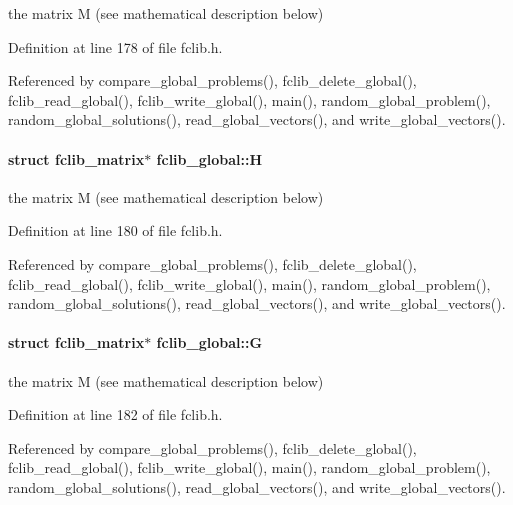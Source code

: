 the matrix M (see mathematical description below) 



Definition at line 178 of file fclib.\+h.



Referenced by compare\+\_\+global\+\_\+problems(), fclib\+\_\+delete\+\_\+global(), fclib\+\_\+read\+\_\+global(), fclib\+\_\+write\+\_\+global(), main(), random\+\_\+global\+\_\+problem(), random\+\_\+global\+\_\+solutions(), read\+\_\+global\+\_\+vectors(), and write\+\_\+global\+\_\+vectors().

\hypertarget{structfclib__global_ac87d5553d144625b9006e2e8b0c89b3c}{}
\paragraph[{H}]{\setlength{\rightskip}{0pt plus 5cm}struct {\bf fclib\+\_\+matrix}$\ast$ fclib\+\_\+global\+::\+H}\label{structfclib__global_ac87d5553d144625b9006e2e8b0c89b3c}


the matrix M (see mathematical description below) 



Definition at line 180 of file fclib.\+h.



Referenced by compare\+\_\+global\+\_\+problems(), fclib\+\_\+delete\+\_\+global(), fclib\+\_\+read\+\_\+global(), fclib\+\_\+write\+\_\+global(), main(), random\+\_\+global\+\_\+problem(), random\+\_\+global\+\_\+solutions(), read\+\_\+global\+\_\+vectors(), and write\+\_\+global\+\_\+vectors().

\hypertarget{structfclib__global_a897c09aca4a010076ed9ddb3f7527a79}{}
\paragraph[{G}]{\setlength{\rightskip}{0pt plus 5cm}struct {\bf fclib\+\_\+matrix}$\ast$ fclib\+\_\+global\+::\+G}\label{structfclib__global_a897c09aca4a010076ed9ddb3f7527a79}


the matrix M (see mathematical description below) 



Definition at line 182 of file fclib.\+h.



Referenced by compare\+\_\+global\+\_\+problems(), fclib\+\_\+delete\+\_\+global(), fclib\+\_\+read\+\_\+global(), fclib\+\_\+write\+\_\+global(), main(), random\+\_\+global\+\_\+problem(), random\+\_\+global\+\_\+solutions(), read\+\_\+global\+\_\+vectors(), and write\+\_\+global\+\_\+vectors().

